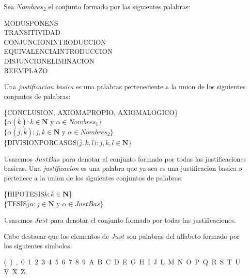 \begin{definition}
  Sea $Nombres_2$ el conjunto formado por las siguientes palabras:
  \begin{center}
    MODUSPONENS\\
    TRANSITIVIDAD\\
    CONJUNCIONINTRODUCCION\\
    EQUIVALENCIAINTRODUCCION\\
    DISJUNCIONELIMINACION\\
    REEMPLAZO\\
  \end{center}

  Una \emph{justificacion basica} es una palabras perteneciente a la union de los siguientes conjuntos de palabras:
  \begin{center}
    \{CONCLUSION, AXIOMAPROPIO, AXIOMALOGICO\}\\
    $\{\alpha(\overline{k}):k\in \mathbf{N} \text{ y } \alpha \in Nombres_1\}$\\
    $\{\alpha(\overline{j},\overline{k}):j,k\in \mathbf{N} \text{ y } \alpha \in Nombres_2\}$\\
    \{DIVISIONPORCASOS($\overline{j},\overline{k},\overline{l}):j,k,l\in\mathbf{N}$\}
  \end{center}
  Usaremos $JustBas$ para denotar al conjunto formado por todas las justificaciones basicas. Una \emph{justificacion} es una
  palabra que ya sea es una justificacion basica o pertenece a la union de los siguientes conjuntos de palabras:
  \begin{center}
    \{HIPOTESIS$\overline{k}:k\in\mathbf{N}$\}\\
    \{TESIS$\overline{j}\alpha:j\in\mathbf{N}\text{ y }\alpha\in JustBas$\}
  \end{center}
  Usaremos $Just$ para denotar el conjunto formado por todas las justificaciones.

  Cabe destacar que los elementos de $Just$ son palabras del alfabeto formado por los siguientes simbolos:
  \begin{center}
  (\ )\ ,\ 0\ 1\ 2\ 3\ 4\ 5\ 6\ 7\ 8\ 9\ A\ B\ C\ D\ E\ G\ H\ I\ J\ L\ M\ N\ O\ P\ Q\ R\ S\ T\ U\ V\ X\ Z
  \end{center}
\end{definition}
